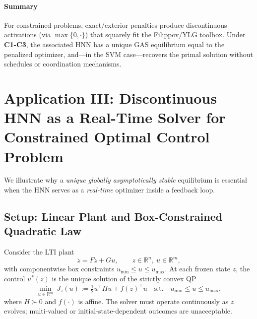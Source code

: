 \documentclass[journal]{IEEEtran}
\begin{document}
\paragraph*{Summary}
For constrained problems, exact/exterior penalties produce discontinuous activations (via \(\max\{0,\cdot\}\)) that squarely fit the Filippov/YLG toolbox. Under \textbf{C1-C3}, the associated HNN has a unique GAS equilibrium equal to the penalized optimizer, and—in the SVM case—recovers the primal solution without schedules or coordination mechanisms.


\section{Application III: Discontinuous HNN as a Real-Time Solver for Constrained Optimal Control Problem}
\label{sec:application_control}

We illustrate why a \emph{unique globally asymptotically stable} equilibrium is essential when the HNN serves as a \emph{real-time} optimizer inside a feedback loop.

\subsection{Setup: Linear Plant and Box-Constrained Quadratic Law}
Consider the LTI plant
\begin{equation}\label{eq:plant}
  \dot z = Fz + Gu, \qquad z\in\mathbb{R}^n,\ u\in\mathbb{R}^m,
\end{equation}
with componentwise box constraints \(u_{\min}\le u\le u_{\max}\).
At each frozen state \(z\), the control \(u^\ast(z)\) is the unique solution of the strictly convex QP
\begin{equation}\label{eq:opt-problem}
  \min_{u\in\mathbb{R}^m}\ J_z(u) := \tfrac12 u^\top H u + f(z)^\top u
  \quad\text{s.t.}\quad u_{\min}\le u\le u_{\max},
\end{equation}
where \(H\succ0\) and \(f(\cdot)\) is affine. The solver must operate continuously as \(z\) evolves; multi-valued or initial-state-dependent outcomes are unacceptable.
\end{document}
